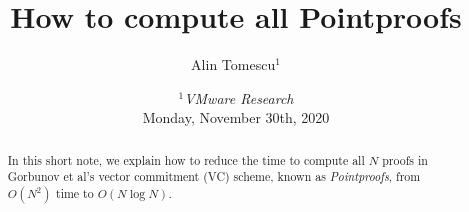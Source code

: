 \documentclass{llncs}
\title{\textbf{How to compute all Pointproofs}} %
\author{Alin Tomescu$^{1}$}
\date{%
{\small $^1$\textit{VMware Research}}\\[.5em]%
{\small Monday, November 30th, 2020}}
\author{}
\date{}                     %
\begin{document}
\maketitle

\ifEurocrypt
    \vspace{-5em}
\fi
\begin{abstract}
    In this short note, we explain how to reduce the time to compute all $N$ proofs in Gorbunov et al's vector commitment (VC) scheme, known as \textit{Pointproofs}, from $O(N^2)$ time to $O(N\log{N})$.
\end{abstract}







\ifEurocrypt
    
    {\footnotesize
    }
\else
    \clearpage
    
    
\fi


\ifNotEurocrypt
\fi
\end{document}
